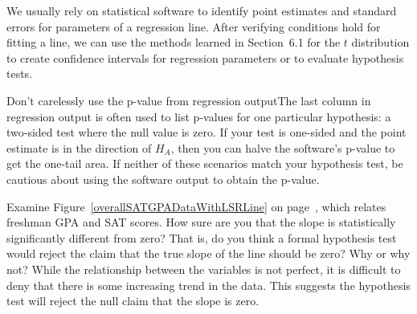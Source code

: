\begin{termBox}{
We usually rely on statistical software to identify point estimates and standard errors for parameters of a regression line. After verifying conditions hold for fitting a line, we can use the methods learned in Section~6.1 for the $t$ distribution to create confidence intervals for regression parameters or to evaluate hypothesis tests.}
\end{termBox}

\begin{caution}{Don't carelessly use the p-value from regression output}{The last column in regression output is often used to list p-values for one particular hypothesis: a two-sided test where the null value is zero. If your test is one-sided and the point estimate is in the direction of $H_A$, then you can halve the software's p-value to get the one-tail area. If neither of these scenarios match your hypothesis test, be cautious about using the software output to obtain the p-value.}
\end{caution}

\begin{example}{Examine Figure~\ref{overallSATGPADataWithLSRLine} on page~\pageref{overallSATGPADataWithLSRLine}, which relates freshman GPA and SAT scores. How sure are you that the slope is statistically significantly different from zero? That is, do you think a formal hypothesis test would reject the claim that the true slope of the line should be zero? Why or why not?} \label{overallSATGPAInformalAssessmentOfRegressionLineSlope}
While the relationship between the variables is not perfect, it is difficult to deny that there is some increasing trend in the data. This suggests the hypothesis test will reject the null claim that the slope is zero.
\end{example}

